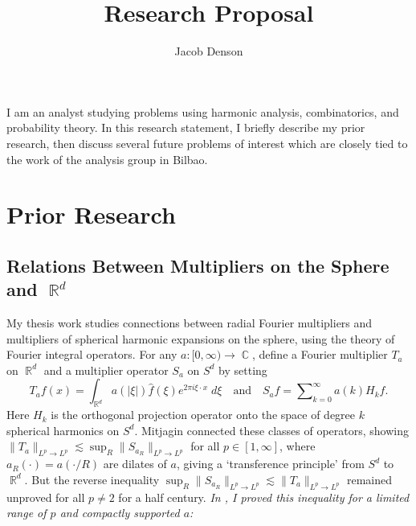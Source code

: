 \documentclass[11pt]{article}
\title{\vspace{-2.5em}Research Proposal\vspace{-0.6em}}
\author{Jacob Denson}
\date{}
\theoremstyle{definition}
\DeclareMathOperator{\RR}{\mathbb{R}}
\DeclareMathOperator{\CC}{\mathbb{C}}
\begin{document}
\maketitle

\setlength{\abovedisplayskip}{2.5pt}
\setlength{\belowdisplayskip}{2.5pt}

\vspace{-1.8em}

I am an analyst studying problems using harmonic analysis, combinatorics, and probability theory. In this research statement, I briefly describe my prior research, then discuss several future problems of interest which are closely tied to the work of the analysis group in Bilbao.

\section*{Prior Research}

\subsection*{Relations Between Multipliers on the Sphere and $\RR^d$}

My thesis work studies connections between radial Fourier multipliers and multipliers of spherical harmonic expansions on the sphere, using the theory of Fourier integral operators. For any $a: [0,\infty) \to \CC$, define a Fourier multiplier $T_a$ on $\RR^d$ and a multiplier operator $S_a$ on $S^d$ by setting
%
\[ T_a f(x) = \int_{\RR^d} a ( |\xi| ) \widehat{f}(\xi) e^{2 \pi i \xi \cdot x}\; d \xi \quad\text{and}\quad S_a f = \sum\nolimits_{k = 0}^\infty a(k) H_k f. \]
%
Here $H_k$ is the orthogonal projection operator onto the space of degree $k$ spherical harmonics on $S^d$. %
Mitjagin \cite{Mitjagin} connected these classes of operators, showing $\| T_a \|_{L^p \to L^p} \lesssim \sup_R \| S_{a_R} \|_{L^p \to L^p}$ for all $p \in [1,\infty]$, where $a_R(\cdot) = a(\cdot/R)$ are dilates of $a$, giving a `transference principle' from $S^d$ to $\RR^d$. But the reverse inequality $\sup_R \| S_{a_R} \|_{L^p \to L^p} \lesssim \| T_a \|_{L^p \to L^p}$ remained unproved for all $p \neq 2$ for a half century. \emph{In \cite{DensonCharacterization}, I proved this inequality for a limited range of $p$ and compactly supported $a$:}
\end{document}
